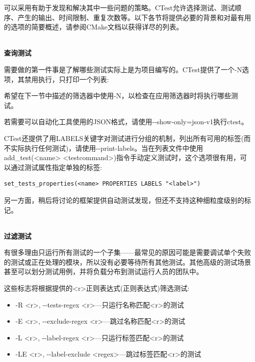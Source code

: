 可以采用有助于发现和解决其中一些问题的策略。CTest允许选择测试、测试顺序、产生的输出、时间限制、重复次数等。以下各节将提供必要的背景和对最有用的选项的简要概述，请参阅CMake文档以获得详尽的列表。

\hspace*{\fill} \\ %
\noindent
\textbf{查询测试}

需要做的第一件事是了解哪些测试实际上是为项目编写的。CTest提供了一个-N选项，其禁用执行，只打印一个列表:


希望在下一节中描述的筛选器中使用-N，以检查在应用筛选器时将执行哪些测试。

若需要可以自动化工具使用的JSON格式，请使用-{}-show-only=json-v1执行ctest。

CTest还提供了用LABELS关键字对测试进行分组的机制，列出所有可用的标签(而不实际执行任何测试)，请使用-{}-print-labels。当在列表文件中使用add\_test(<name> <testcommand>)指令手动定义测试时，这个选项很有用，可以通过测试属性指定单独的标签:

\begin{lstlisting}[style=styleCMake]
set_tests_properties(<name> PROPERTIES LABELS "<label>")
\end{lstlisting} 

另一方面，稍后将讨论的框架提供自动测试发现，但还不支持这种细粒度级别的标记。

\hspace*{\fill} \\ %
\noindent
\textbf{过滤测试}

有很多理由只运行所有测试的一个子集——最常见的原因可能是需要调试单个失败的测试或正在处理的模块，所以没有必要等待所有其他测试。其他高级的测试场景甚至可以划分测试用例，并将负载分布到测试运行人员的团队中。

这些标志将根据提供的<r>正则表达式(正则表达式)筛选测试:

\begin{itemize}
\item 
-R <r>, -{}-tests-regex <r>—只运行名称匹配<r>的测试

\item 
-E <r>, -{}-exclude-regex <r>—跳过名称匹配<r>的测试

\item 
-L <r>, -{}-label-regex <r>—只运行标签匹配<r>的测试

\item 
-LE <r>, -{}-label-exclude <regex>—跳过标签匹配<r>的测试
\end{itemize}

